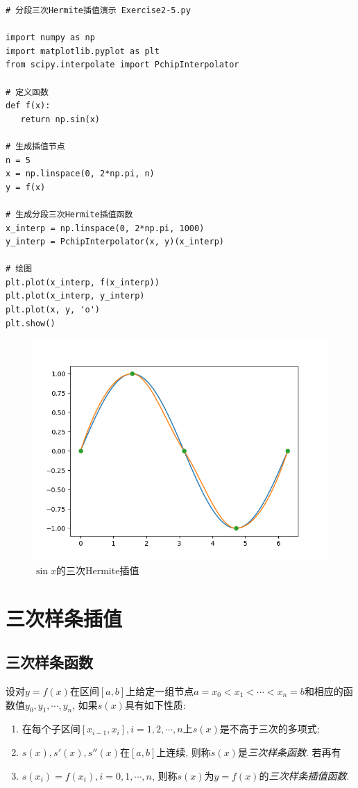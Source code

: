 \begin{lstlisting}
# 分段三次Hermite插值演示 Exercise2-5.py

import numpy as np 
import matplotlib.pyplot as plt 
from scipy.interpolate import PchipInterpolator 

# 定义函数 
def f(x): 
   return np.sin(x)
 
# 生成插值节点 
n = 5 
x = np.linspace(0, 2*np.pi, n)
y = f(x)

# 生成分段三次Hermite插值函数 
x_interp = np.linspace(0, 2*np.pi, 1000)
y_interp = PchipInterpolator(x, y)(x_interp)
 
# 绘图 
plt.plot(x_interp, f(x_interp)) 
plt.plot(x_interp, y_interp) 
plt.plot(x, y, 'o') 
plt.show()
\end{lstlisting}

\begin{figure}[h]
    \centering
    \includegraphics[width=1\linewidth]{Chapter2/graph/python/Figure2-4.png}
    \caption{$\sin{x}$的三次Hermite插值}
    \label{fig:三次Hermite插值}
\end{figure}

\section{三次样条插值}

\subsection{三次样条函数}

设对$y=f(x)$在区间$[a,b]$上给定一组节点$a=x_0<x_1<\cdots<x_n=b$和相应的函数值$y_0,y_1,\cdots,y_n$, 如果$s(x)$具有如下性质:
\begin{enumerate}
    \item 在每个子区间$[x_{i-1},x_i],i=1,2,\cdots,n$上$s(x)$是不高于三次的多项式;
    \item $s(x),s'(x),s''(x)$在$[a,b]$上连续, 则称$s(x)$是\emph{三次样条函数}. 若再有
    \item $s(x_i)=f(x_i),i=0,1,\cdots,n$, 则称$s(x)$为$y=f(x)$的\emph{三次样条插值函数}.
\end{enumerate}

